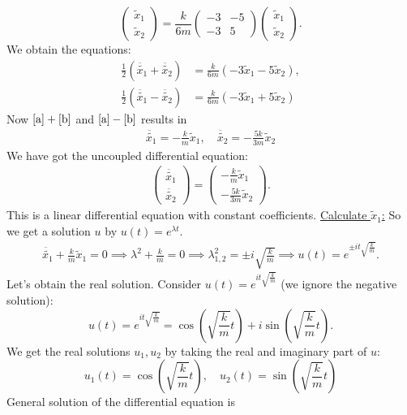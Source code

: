 \documentclass{article}
\theoremstyle{named}
\begin{document}
\begin{enumerate}[label=(\roman*)]
\[\begin{pmatrix}
			\tilde x_1 \\ \tilde x_2
		\end{pmatrix} = \frac{k}{6m}\begin{pmatrix}
			-3 & -5 \\ -3 & 5
		\end{pmatrix}\begin{pmatrix}
		\tilde x_1 \\ \tilde x_2
		\end{pmatrix}.
	\]
	We obtain the equations:
	\begin{align}
		\frac{1}{2}(\ddot{\tilde{x_1}} + \ddot{\tilde{x_2}}) &= \frac{k}{6m}(-3\tilde x_1 - 5 \tilde x_2), \label{a} \\
		\frac{1}{2}(\ddot{\tilde{x_1}} - \ddot{\tilde{x_2}}) &= \frac{k}{6m}(-3\tilde x_1 + 5 \tilde x_2) \label{b}
	\end{align}
	Now $\eqref{a}+\eqref{b}$ and $\eqref{a}-\eqref{b}$ results in
	\begin{align*}
		\ddot{\tilde{x_1}} = -\frac{k}{m} \tilde x_1, \quad 
		\ddot{\tilde{x_2}}= -\frac{5k}{3m} \tilde x_2 
	\end{align*}
	We have got the uncoupled differential equation:
	\begin{align*}
		\begin{pmatrix}
			\ddot{\tilde{x_1}} \\ \ddot{\tilde{x_2}}
		\end{pmatrix} = \begin{pmatrix}
			-\frac{k}{m} \tilde x_1 \\ -\frac{5k}{3m} \tilde x_2 
		\end{pmatrix}.
	\end{align*}
	This is a linear differential equation with constant coefficients. \underline{Calculate $\tilde x_1$:} So we get a solution $u$ by $u(t) = e^{\lambda t}$.
	\begin{align*}
			\ddot{\tilde{x_1}} + \frac{k}{m}\tilde x_1 = 0 \implies \lambda^2 + \frac{k}{m} = 0 \implies \lambda^2_{1,2} = \pm i \sqrt{\frac{k}{m}} \implies u(t) = e^{\pm it \sqrt{\frac{k}{m}}}.
 	\end{align*}
 	Let's obtain the real solution. Consider $u(t) = e^{ it \sqrt{\frac{k}{m}}}$ (we ignore the negative solution):
 	\[
 		u(t) = e^{ it \sqrt{\frac{k}{m}}} = \cos{(\sqrt{\frac{k}{m}}t)} + i\sin{(\sqrt{\frac{k}{m}}t)}.
 	\]
 	We get the real solutions $u_1, u_2$ by taking the real and imaginary part of $u$:
 	\[
 		u_1(t) =  \cos{(\sqrt{\frac{k}{m}}t)}, \quad u_2(t) = \sin{(\sqrt{\frac{k}{m}}t)}
 	\]
 	General solution of the differential equation is

\end{enumerate}
\end{document}
